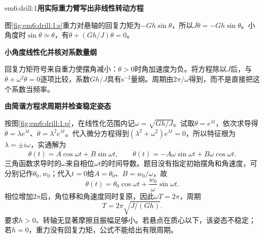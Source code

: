 \LectureAnswerSection

\begin{drillsolution}{em6:drill:1}\textbf{用实际重力臂写出非线性转动方程}\par\nobreak
图\ref{fig:em6:drill:1:s}重力对悬轴的回复力矩为$-Gh\sin\theta$，所以$J\ddot\theta=-Gh\sin\theta$。小角度时$\sin\theta\simeq\theta$，有$\ddot\theta+(Gh/J)\theta=0$。



\par\medskip{}\noindent\textbf{小角度线性化并核对系数量纲}\par\nobreak
回复力矩符号来自重力使摆角减小：$\theta>0$时角加速度为负。将方程除以$J$后，与$\ddot\theta+\omega^2\theta=0$逐项比较，系数$Gh/J$具有$\mathrm{s^{-2}}$量纲。周期由$2\pi/\omega$得到，而不是直接把这个系数当频率。



\par\medskip{}\noindent\textbf{由简谐方程求周期并检查稳定姿态}\par\nobreak
按图\ref{fig:em6:drill:1:p}，在线性化范围内记$\omega=\sqrt{Gh/J}$。试取$\theta=e^{\lambda t}$，依次求导得$\dot\theta=\lambda e^{\lambda t}$、$\ddot\theta=\lambda^2e^{\lambda t}$。代入微分方程得到$(\lambda^2+\omega^2)e^{\lambda t}=0$，所以特征根为$\lambda=\pm i\omega$，实通解为
\[
 \theta(t)=A\cos\omega t+B\sin\omega t,
 \qquad \dot\theta(t)=-A\omega\sin\omega t+B\omega\cos\omega t.
\]
三角函数求导时的$\omega$来自相位$\omega t$的时间导数。题目没有指定初始摆角和角速度，可分别记作$\theta_0,w_0$；代入$t=0$给$A=\theta_0$、$B=w_0/\omega$，故
\[
 \theta(t)=\theta_0\cos\omega t+\frac{w_0}{\omega}\sin\omega t.
\]
相位增加$2\pi$后，角位移和角速度同时复原，因此$\omega T=2\pi$，周期
\[\boxed{T=2\pi\sqrt{J/(Gh)}}.\]
要求$h>0$、转轴无显著摩擦且振幅足够小。若悬点在质心以下，该姿态不稳定；若$h=0$，重力没有回复力矩，公式不能给出有限周期。\end{drillsolution}

